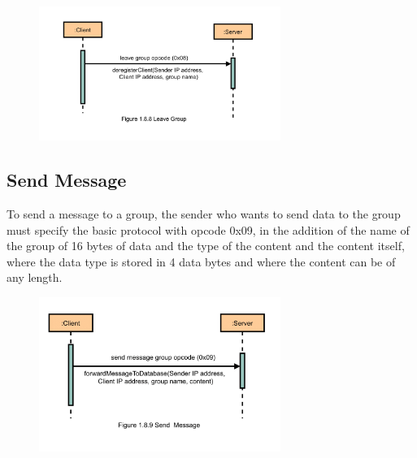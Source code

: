 				\begin{figure}
					\centering
							\includegraphics[width=0.7\textwidth]{gfx/1.8.8_Leave_Group}
					\label{fig:leave-group}
				\end{figure}

    \subsection{Send Message}\label{subsec:send}
	To send a message to a group, the sender who wants to send data to the group must specify
    the basic protocol  with opcode 0x09, in the addition of the name of the group of 16 bytes
    of data and the type of the content and the content itself, where the data type is stored
    in 4 data bytes and where the content can be of any length.
    
		    \begin{figure}
		    	\centering
		    		\includegraphics[width=0.7\textwidth]{gfx/1.8.9_Send_Message}
		    	\label{fig:send-message}
		    \end{figure}
    \medskip

    \noindent

   




